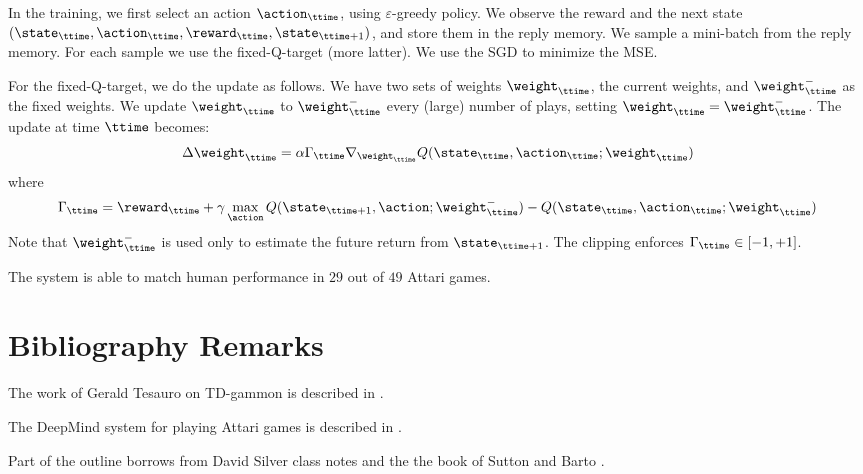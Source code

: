 In the training, we first select an action $\action_\ttime$, using
$\varepsilon$-greedy policy. We observe the reward and the next
state
$(\state_\ttime,\action_\ttime,\reward_\ttime,\state_{\ttime+1})$,
and store them in the reply memory. We sample a mini-batch from the
reply memory. For each sample we use the fixed-Q-target (more
latter). We use the SGD to minimize the MSE.

For the fixed-Q-target, we do the update as follows. We have two
sets of weights $\weight_\ttime$, the current weights, and
$\weight^-_\ttime$ as the fixed weights. We update $\weight_\ttime$
to $\weight^-_\ttime$ every (large) number of plays, setting
$\weight_\ttime=\weight^-_\ttime$. The update at time $\ttime$
becomes:
\[
\Delta \weight_\ttime = \alpha \Gamma_\ttime \nabla_{\weight_\ttime}
Q(\state_\ttime,\action_\ttime;\weight_\ttime)
\]
where
\[
\Gamma_{\ttime}=\reward_\ttime+\gamma \max_\action
Q(\state_{\ttime+1},\action;\weight^-_\ttime)-Q(\state_\ttime,\action_\ttime;\weight_\ttime)
\]
Note that $\weight^-_\ttime$ is used only to estimate the future
return from $\state_{\ttime+1}$. The clipping enforces
$\Gamma_\ttime\in[-1,+1]$.

The system is able to match human performance in $29$ out of $49$
Attari games.







\section{Bibliography Remarks}

The work of Gerald Tesauro on TD-gammon is described in
\cite{Tesauro95,Tesauro02}.

The DeepMind system for playing Attari games is described in
\cite{MnihKSRVBGRFOPB15}.


Part of the outline borrows from David Silver class notes and the
the book of Sutton and Barto \cite{SuttonB98}.
